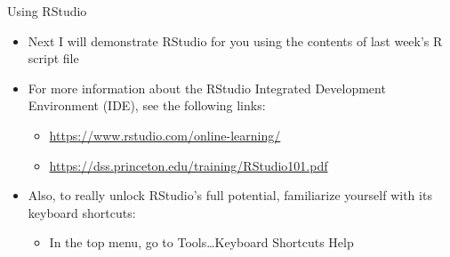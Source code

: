 \documentclass[ignorenonframetext,]{beamer}
\providecommand{\tightlist}{%
  \setlength{\itemsep}{0pt}\setlength{\parskip}{0pt}}
\begin{document}
\begin{frame}{Using RStudio}

\begin{itemize}
\tightlist
\item
  Next I will demonstrate RStudio for you using the contents of last
  week's R script file
\item
  For more information about the RStudio Integrated Development
  Environment (IDE), see the following links:

  \begin{itemize}
  \tightlist
  \item
    \url{https://www.rstudio.com/online-learning/}
  \item
    \url{https://dss.princeton.edu/training/RStudio101.pdf}
  \end{itemize}
\item
  Also, to really unlock RStudio's full potential, familiarize yourself
  with its keyboard shortcuts:

  \begin{itemize}
  \tightlist
  \item
    In the top menu, go to Tools\ldots{}Keyboard Shortcuts Help
  \end{itemize}
\end{itemize}

\end{frame}
\end{document}
